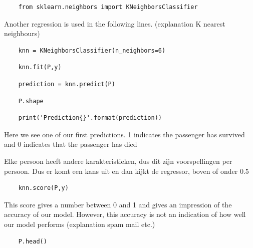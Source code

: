 \documentclass[11pt]{article}
\begin{document}
\begin{verbatim}
    from sklearn.neighbors import KNeighborsClassifier
\end{verbatim}

Another regression is used in the following lines. (explanation K
nearest neighbours)

\begin{verbatim}
    knn = KNeighborsClassifier(n_neighbors=6)
\end{verbatim}

\begin{verbatim}
    knn.fit(P,y)
\end{verbatim}

\begin{verbatim}
    prediction = knn.predict(P)
\end{verbatim}

\begin{verbatim}
    P.shape
\end{verbatim}

\begin{verbatim}
    print('Prediction{}'.format(prediction))
\end{verbatim}

Here we see one of our first predictions. 1 indicates the passenger has
survived and 0 indicates that the passenger has died

Elke persoon heeft andere karakteristieken, dus dit zijn voorspellingen
per persoon. Dus er komt een kans uit en dan kijkt de regressor, boven
of onder 0.5

\begin{verbatim}
    knn.score(P,y)
\end{verbatim}

This score gives a number between 0 and 1 and gives an impression of the
accuracy of our model. However, this accuracy is not an indication of
how well our model performs (explanation spam mail etc.)

\begin{verbatim}
    P.head()
\end{verbatim}
\end{document}
